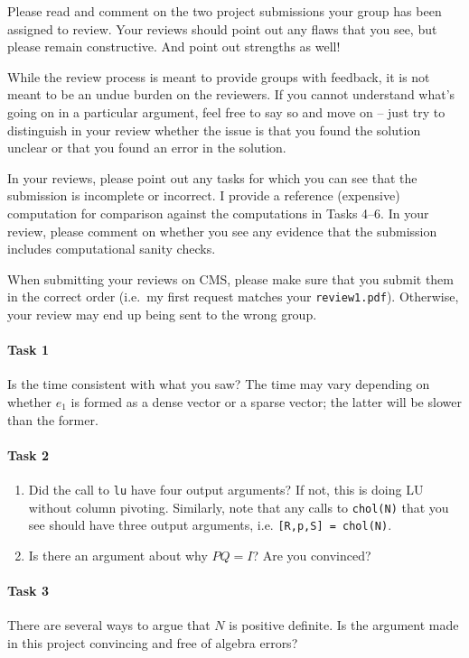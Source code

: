 \documentclass[12pt, leqno]{article}
\begin{document}

Please read and comment on the two project submissions your group has
been assigned to review.  Your reviews should point out any flaws that
you see, but please remain constructive.  And point out
strengths as well!

While the review process is meant to provide groups with feedback,
it is not meant to be an undue burden on the reviewers.  If you cannot
understand what's going on in a particular argument, feel free to say
so and move on -- just try to distinguish in your review whether the
issue is that you found the solution unclear or that you found an
error in the solution.

In your reviews, please point out any tasks for which you can see that
the submission is incomplete or incorrect.  I provide a reference
(expensive) computation for comparison against the computations
in Tasks 4--6.  In your review, please comment on whether you see any
evidence that the submission includes computational sanity checks.

When submitting your reviews on CMS, please make sure that you
submit them in the correct order (i.e.~my first request matches
your {\tt review1.pdf}).  Otherwise, your review may end up being
sent to the wrong group.

\paragraph*{Task 1}
Is the time consistent with what you saw?  The time may vary depending
on whether $e_1$ is formed as a dense vector or a sparse vector; the
latter will be slower than the former.

\paragraph*{Task 2}
\begin{enumerate}
\item
  Did the call to {\tt lu} have four output arguments?  If not, this is
  doing LU without column pivoting.  Similarly, note that any calls to
  {\tt chol(N)} that you see should have three output arguments, i.e.
  {\tt [R,p,S] = chol(N)}.
\item
  Is there an argument about why $PQ = I$?  Are you convinced?
\end{enumerate}

\paragraph*{Task 3}
There are several ways to argue that $N$ is positive definite.  Is the
argument made in this project convincing and free of algebra errors?
\end{document}
